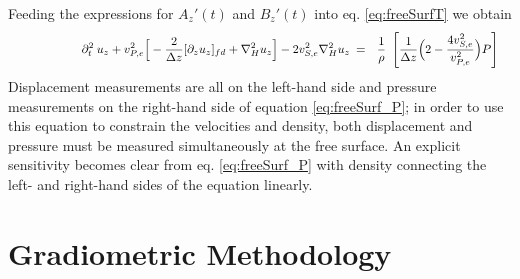 \documentclass[]{article}
\begin{document}
	Feeding the expressions for $A_{z}'(t) $ and $B_{z}'(t) $ into eq. \eqref{eq:freeSurfT} we obtain
	\begin{align} \shoveright \shoveright \shoveright \shoveright \shoveright \shoveright 
		\partial_{t}^{2} \: u_{z}  +  v_{P,e}^{2} \Big[ - \frac{2}{\Delta z}  [\partial_{z} u_{z}]_{fd} +  \nabla_{H}^{2}u_{z} \Big] - 2 v_{S,e}^{2} \nabla_{H}^{2}u_{z}  \: &=  \: \: \: \frac{1}{\rho} \: \;  \Bigg[ \frac{1}{\Delta z} \Big( 2 - \frac{4v_{S,e}^{2}}{v_{P,e}^{2}}\Big) P\Bigg]
		\label{eq:freeSurf_P}   
	\end{align}
	Displacement measurements are all on the left-hand side and pressure measurements on the right-hand side of equation \eqref{eq:freeSurf_P}; in order to use this equation to constrain the velocities and density, both displacement and pressure must be measured simultaneously at the free surface. An explicit sensitivity becomes clear from eq. \eqref{eq:freeSurf_P} with density connecting the left- and right-hand sides of the equation linearly.\\
	
	\section{Gradiometric Methodology} \label{meth}
\end{document}
